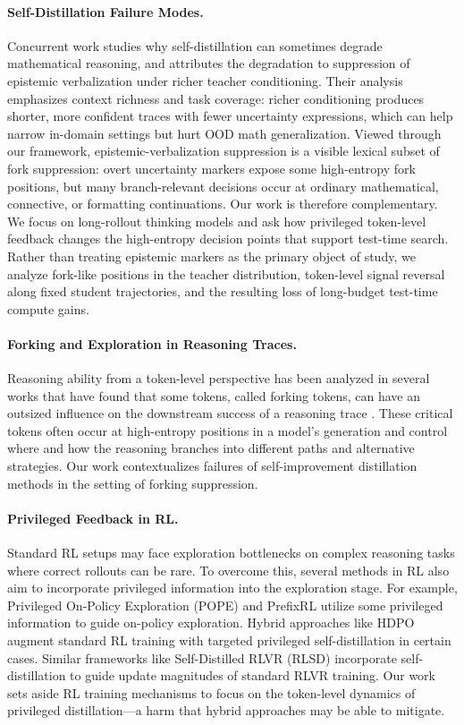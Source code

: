 \paragraph{Self-Distillation Failure Modes.}
Concurrent work \citep{kim2026doesselfdistillationsometimesdegrade} studies why
self-distillation can sometimes degrade mathematical reasoning, and attributes
the degradation to suppression of epistemic verbalization under richer teacher
conditioning. Their analysis emphasizes context richness and task coverage:
richer conditioning produces shorter, more confident traces with fewer
uncertainty expressions, which can help narrow in-domain settings but hurt OOD
math generalization. Viewed through our framework, epistemic-verbalization
suppression is a visible lexical subset of fork suppression: overt uncertainty
markers expose some high-entropy fork positions, but many branch-relevant
decisions occur at ordinary mathematical, connective, or formatting
continuations. Our work is therefore complementary. We focus on long-rollout
thinking models and ask how privileged token-level feedback changes the
high-entropy decision points that support test-time search. Rather than treating
epistemic markers as the primary object of study, we analyze fork-like positions
in the teacher distribution, token-level signal reversal along fixed student
trajectories, and the resulting loss of long-budget test-time compute gains.

\paragraph{Forking and Exploration in Reasoning Traces.}
Reasoning ability from a token-level perspective has been analyzed in several
works that have found that some tokens, called forking tokens, can have an
outsized influence on the downstream success of a reasoning trace
\cite{bigelow2024forking, lin2024critical, vassoyan2025ignore,
zhang2026embarrassingly}. These critical tokens often occur at high-entropy
positions in a model's generation and control where and how the reasoning
branches into different paths and alternative strategies. Our work
contextualizes failures of self-improvement distillation methods in the setting
of forking suppression.

\paragraph{Privileged Feedback in RL.}
Standard RL setups may face exploration bottlenecks on complex reasoning tasks where correct rollouts can be rare. To overcome this, several methods in RL also aim to incorporate privileged information into the exploration stage. For example, Privileged On-Policy Exploration (POPE) \cite{qu2026pope} and PrefixRL \cite{setlur2026reuse} utilize some privileged information to guide on-policy exploration. Hybrid approaches like HDPO \cite{ding2026hdpo} augment standard RL training with targeted privileged self-distillation in certain cases. Similar frameworks like Self-Distilled RLVR (RLSD) \cite{yang2026self} incorporate self-distillation to guide update magnitudes of standard RLVR training. Our work sets aside RL training mechanisms to focus on the token-level dynamics of privileged distillation---a harm that hybrid approaches may be able to mitigate.
